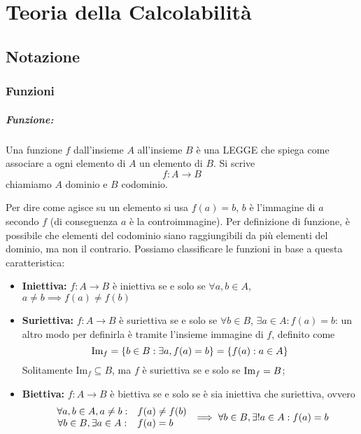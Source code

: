 
\chapter{Teoria della Calcolabilità}

\section{Notazione}

\subsection{Funzioni}

\paragraph{Funzione:} Una funzione $f$ dall'insieme $A$ all'insieme $B$ è una LEGGE che spiega come associare a ogni elemento di $A$ un elemento di $B$. Si scrive
$$ f: A \rightarrow B $$
chiamiamo $A$ dominio e $B$ codominio. 

Per dire come agisce su un elemento si usa $f(a) = b$, $b$ è l'immagine di $a$ secondo $f$ (di conseguenza $a$ è la controimmagine). Per definizione di funzione, è possibile che elementi del codominio siano raggiungibili da più elementi del dominio, ma non il contrario. Possiamo classificare le funzioni in base a questa caratteristica:
\begin{itemize}
	\item \textbf{Iniettiva:} $f: A \rightarrow B$ è iniettiva se e solo se $\forall a,b \in A$, $a \neq b \implies f(a) \neq f(b)$
	
    \item \textbf{Suriettiva:} $f: A \rightarrow B$ è suriettiva se e solo se $\forall b \in B$, $\exists a \in A: f(a) = b$: un altro modo per definirla è tramite l'insieme immagine di $f$, definito come
	$$ \text{Im}_f = \{b \in B: \exists a, f(a) = b \} = \{f(a): a \in A \} $$
	Solitamente $\text{Im}_f \subseteq B$, ma $f$ è suriettiva se e solo se $ \text{Im}_f = B$;
	
    \item \textbf{Biettiva:} $f: A \rightarrow B$ è biettiva se e solo se è sia iniettiva che suriettiva, ovvero
	$$
	\begin{array}{c l}
		\forall a, b \in A, a \neq b: & f(a) \neq f(b) \\
		\forall b \in B, \exists a \in A: & f(a) = b
	\end{array}
	\implies \forall b \in B, \exists! a \in A: f(a) = b
	$$
\end{itemize}


